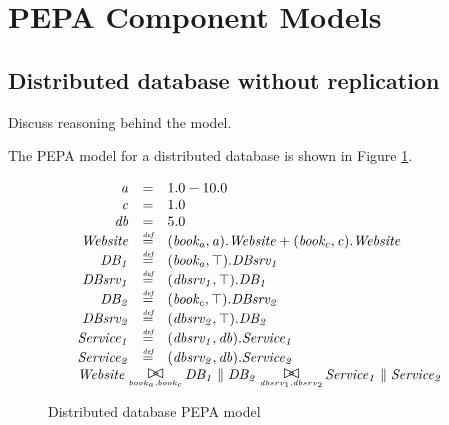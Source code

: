 %
%

\section{PEPA Component Models}

%
%
\subsection{Distributed database without replication}

\begin{shaded}
Discuss reasoning behind the model.

The PEPA model for a distributed database is shown in Figure \ref{figure:pepa_dd_model}.
\end{shaded}



\begin{figure}
	\caption{Distributed database PEPA model}
	\label{figure:pepa_dd_model}
	\centering
\begin{displaymath}
	\begin{array}{rcl}
		\mathit{a} & = & 1.0-10.0\\
		\mathit{c} & = & 1.0\\
		\mathit{db} & = & 5.0\\
		[0.0ex]		\mathit{Website} & \rmdef & (\mathit{book_a},\mathit{a}).\mathit{Website}+(\mathit{book_c},\mathit{c}).\mathit{Website}\\
		\mathit{DB_1} & \rmdef & (\mathit{book_a},\top).\mathit{DBsrv_1}\\
		\mathit{DBsrv_1} & \rmdef & (\mathit{dbsrv_1},\top).\mathit{DB_1}\\
		\mathit{DB_2} & \rmdef & (\mathit{book_c},\top).\mathit{DBsrv_2}\\
		\mathit{DBsrv_2} & \rmdef & (\mathit{dbsrv_2},\top).\mathit{DB_2}\\
		\mathit{Service_1} & \rmdef & (\mathit{dbsrv_1},\mathit{db}).\mathit{Service_1}\\
		\mathit{Service_2} & \rmdef & (\mathit{dbsrv_2},\mathit{db}).\mathit{Service_2}\\
		[0.0ex]		\multicolumn{3}{l}{\mathit{Website}\sync{book_a,book_c}\mathit{DB_1}\parallel\mathit{DB_2}\sync{dbsrv_1,dbsrv_2}\mathit{Service_1}\parallel\mathit{Service_2}}\\
		[0.0ex]	\end{array}
\end{displaymath}
\end{figure}

